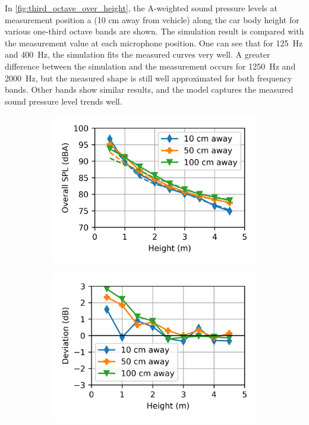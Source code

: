 In \cref{fig:third_octave_over_height}, the A-weighted sound pressure levels at measurement position a (10 cm away from vehicle) along the car body height for various one-third octave bands are shown. The simulation result is compared with the measurement value at each microphone position. One can see that for \SI{125}{\hertz} and \SI{400}{\hertz}, the simulation fits the measured curves very well. A greater difference between the simulation and the measurement occurs for \SI{1250}{\hertz} and \SI{2000}{\hertz}, but the measured shape is still well approximated for both frequency bands. Other bands show similar results, and the model captures the measured sound pressure level trends well.

\begin{figure}%
	\centering
	\begin{subfigure}[b]{0.49\textwidth}
		\centering
		\includegraphics{fig/chap5/initial_model/overall_SPL/all_pos.png}
	\end{subfigure}
	\hfill
	\begin{subfigure}[b]{0.49\textwidth}
		\centering
		\includegraphics{fig/chap5/initial_model/overall_SPL/deviation.png}

\end{subfigure}
\end{figure}
